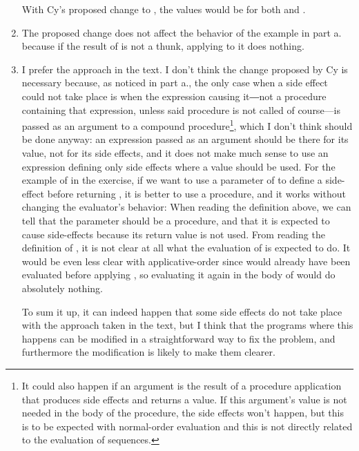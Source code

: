 \begin{exe}[4.30]
\begin{enumerate}
	    With Cy’s proposed change to , the values would 
	    be  for both  and .
        \item The proposed change does not affect the behavior of the example in 
            part a. because if the result of  is not a thunk, 
            applying  to it does nothing.
        \item I prefer the approach in the text. I don’t think the change 
            proposed by Cy is necessary because, as noticed in part a., the only 
            case when a side effect could not take place is when the expression 
            causing it―not a procedure containing that expression, unless said 
            procedure is not called of course—is passed as an argument to 
            a compound procedure\footnote{It could also happen if an argument is 
            the result of a procedure application that produces side effects and 
            returns a value. If this argument’s value is not needed in the body 
            of the procedure, the side effects won’t happen, but this is to be 
            expected with normal-order evaluation and this is not directly 
            related to the evaluation of sequences.}, which I don’t think should 
            be done anyway: an expression passed as an argument should be there 
            for its value, not for its side effects, and it does not make much 
            sense to use an expression defining only side effects where a value 
            should be used. For the example of  in the exercise, if we 
            want to use a parameter of  to define a side-effect before 
            returning , it is better to use a procedure, and it works 
            without changing the evaluator’s behavior:
	    When reading the definition above, we can tell that the parameter 
	     should be a procedure, and that it is expected to cause 
	    side-effects because its return value is not used. From reading the 
	    definition of , it is not clear at all what the evaluation 
	    of  is expected to do. It would be even less clear with 
	    applicative-order since  would already have been evaluated 
	    before applying , so evaluating it again in the body of 
	     would do absolutely nothing.

	    To sum it up, it can indeed happen that some side effects do not 
	    take place with the approach taken in the text, but I think that the 
	    programs where this happens can be modified in a straightforward way 
	    to fix the problem, and furthermore the modification is likely to 
	    make them clearer.
    \end{enumerate}
\end{exe}

